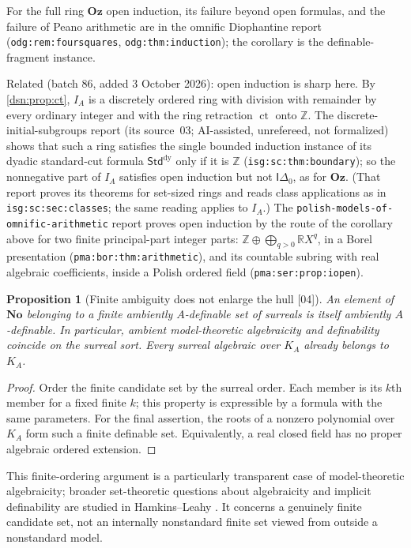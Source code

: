 \documentclass[11pt,a4paper]{article}
\numberwithin{equation}{section}
\newtheorem{proposition}[proposition]{Proposition}
\theoremstyle{definition}
\theoremstyle{remark}
\newcommand{\No}{\mathbf{No}}
\newcommand{\Oz}{\mathbf{Oz}}
\newcommand{\Z}{\mathbb Z}
\newcommand{\R}{\mathbb R}
\newcommand{\ct}{\operatorname{ct}}
\newcommand{\src}[1]{\textup{\textsf{\small[#1]}}}
\newcommand{\lbl}[1]{\nolinkurl{#1}}
\newcommand{\fn}[1]{\nolinkurl{#1}}
\begin{document}
For the full ring $\Oz$ open induction, its failure beyond open formulas,
and the failure of Peano arithmetic are in the omnific Diophantine report
(\lbl{odg:rem:foursquares}, \lbl{odg:thm:induction}); the corollary is
the definable-fragment instance.

Related (batch 86, added 3 October 2026): open induction is sharp here. By
\cref{dsn:prop:ct}, $I_A$ is a discretely ordered ring with division with
remainder by every ordinary integer and with the ring retraction $\ct$ onto
$\Z$. The discrete-initial-subgroups report (its source~03; AI-assisted,
unrefereed, not formalized) shows that such a ring satisfies the single
bounded induction instance of its dyadic standard-cut formula
$\mathsf{Std}^{\mathrm{dy}}$ only if it is $\Z$ (\lbl{isg:sc:thm:boundary});
so the nonnegative part of $I_A$ satisfies open induction but not
$\mathsf{I}\Delta_0$, as for $\Oz$. (That report proves its theorems for
set-sized rings and reads class applications as in
\lbl{isg:sc:sec:classes}; the same reading applies to $I_A$.) The
\fn{polish-models-of-omnific-arithmetic} report proves open induction by the
route of the corollary above for two finite principal-part integer parts:
$\Z\oplus\bigoplus_{q>0}\R X^q$, in a Borel presentation
(\lbl{pma:bor:thm:arithmetic}), and its countable subring with real
algebraic coefficients, inside a Polish ordered field
(\lbl{pma:ser:prop:iopen}).

\begin{proposition}[Finite ambiguity does not enlarge the hull \src{04}]
\label{dsn:prop:algebraicity}
An element of $\No$ belonging to a finite ambiently $A$-definable set
of surreals is itself ambiently $A$-definable. In particular, ambient
model-theoretic algebraicity and definability coincide on the surreal
sort. Every surreal algebraic over $K_A$ already belongs to $K_A$.
\end{proposition}
\begin{proof}
Order the finite candidate set by the surreal order. Each member is
its $k$th member for a fixed finite $k$; this property is expressible
by a formula with the same parameters. For the final assertion, the
roots of a nonzero polynomial over $K_A$ form such a finite definable
set. Equivalently, a real closed field has no proper algebraic ordered
extension.
\end{proof}

This finite-ordering argument is a particularly transparent case of
model-theoretic algebraicity; broader set-theoretic questions about
algebraicity and implicit definability are studied in
Hamkins--Leahy \cite{HamkinsLeahy}. It concerns a genuinely finite
candidate set, not an internally nonstandard finite set viewed from
outside a nonstandard model.
\end{document}
